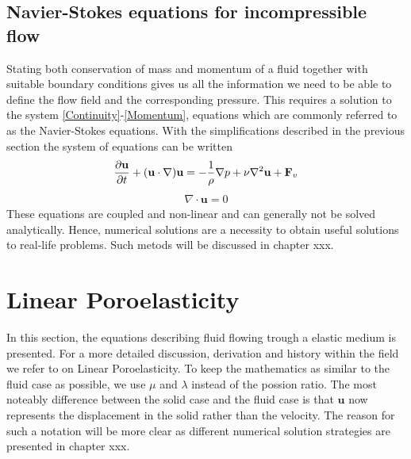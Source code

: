 \subsection{Navier-Stokes equations for incompressible flow}
Stating both conservation of mass and momentum of a fluid together with suitable boundary conditions gives us all the information we need to be able to define the flow field and the corresponding pressure. This requires a solution to the system \eqref{Continuity}-\eqref{Momentum}, equations which are commonly referred to as the Navier-Stokes equations. With the simplifications described in the previous section the system of equations can be written
\begin{align}
\frac{\partial \mathbf{u}}{\partial t} + (\mathbf{u} \cdot \nabla) \mathbf{u} = -\frac{1}{\rho}\nabla p + \nu\nabla^2 \mathbf{u} + \mathbf{F}_v \label{Navier}
\end{align}
\begin{align}
\nabla \cdot \mathbf{u} = 0 \label{Stokes}
\end{align}
These equations are coupled and non-linear and can generally not be solved analytically. Hence, numerical solutions are a necessity to obtain useful solutions to real-life problems. Such metods will be discussed in chapter xxx. 


\section{Linear Poroelasticity}
In this section, the equations describing fluid flowing trough a elastic medium is presented. For a more detailed discussion, derivation and history within the field we refer to \cite{Wang} on Linear Poroelasticity. To keep the mathematics as similar to the fluid case as possible, we use $\mu$ and $\lambda$ instead of the possion ratio. The most noteably difference between the solid case and the fluid case is that $\mathbf{u}$ now represents the displacement in the solid rather than the velocity. The reason for such a notation will be more clear as different numerical solution strategies are presented in chapter xxx.
\\
\\

